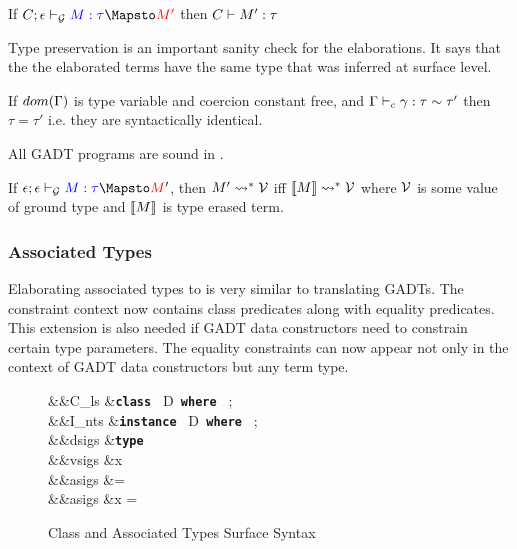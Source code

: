 \documentclass[manuscript,screen,nonacm]{acmart}
\begin{document}
\begin{lemma}
  If $\GTranslate C \empt \Tm \tau {\Tm'}$ then $C \vdash M' : \tau$
\end{lemma}
Type preservation is an important sanity check for the elaborations. It says that the the elaborated terms have the same type that was inferred at surface level.

\begin{theorem}
  If $dom(\Gamma)$ is type variable and coercion constant free, and $\Gamma \vdash_{c} \gamma : \tau\sim\tau'$ then $\tau = \tau'$ i.e. they are syntactically identical.
\end{theorem}

All GADT programs are sound in \SFC.

\begin{theorem}
  If $\GTranslate \empt \empt \Tm \tau \Tm'$, then $M' \rightsquigarrow^* \mathcal{V}$ iff $\llbracket M\rrbracket \rightsquigarrow^* \mathcal{V}$ where $\mathcal{V}$ is some value of ground type and $\llbracket M\rrbracket$ is type erased term.
\end{theorem}

\subsubsection{Associated Types}
Elaborating associated types to \SFC is very similar to translating GADTs. The constraint context now contains class predicates along with equality predicates. This extension is also needed if GADT data constructors need to constrain certain type parameters. The equality constraints can now appear not only in the context of GADT data constructors but any term type.

\begin{figure}[ht]
  \centering
  \begin{syntax}
     &&C_{ls} &\bnfeq \textbf{\texttt{class }} D\App\many\alpha \textbf{\texttt{ where }} ; \\
     &&I_{nts} &\bnfeq \textbf{\texttt{instance }} D\App\many\tau \textbf{\texttt{ where }} ; \\
     &&dsigs &\bnfeq \textbf{\texttt{type }} \tau\\
     &&vsigs &\bnfeq x\co\tau\\
     &&asigs &\bnfeq \tau = \sigma\\
     &&asigs &\bnfeq x = \Tm
  \end{syntax}
  \caption[Class Syntax]{Class and Associated Types Surface Syntax}
  \label{fig:assoc-types-syntax}
\end{figure}
\end{document}
